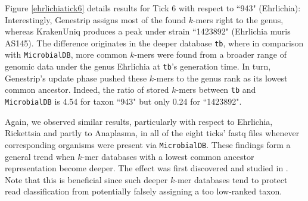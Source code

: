 \documentclass[pdflatex,sn-vancouver-num]{sn-jnl}
\begin{document}
    Figure \ref{ehrlichiatick6} details results for Tick 6 with respect to ``943" (Ehrlichia):
    Interestingly, Genestrip assigns most of the found $k$-mers right to the genus, whereas KrakenUniq produces a peak under strain ``1423892" (Ehrlichia muris AS145). The difference originates in the deeper database \texttt{tb}, where in comparison with \texttt{MicrobialDB}, more common $k$-mers were found from a broader range of genomic data under the genus Ehrlichia at \texttt{tb}'s generation time. In turn, Genestrip's update phase pushed these $k$-mers to the genus rank as its lowest common ancestor. Indeed, the ratio of stored $k$-mers between \texttt{tb} and \texttt{MicrobialDB} is 4.54 for taxon ``943" but only 0.24 for ``1423892". 

    Again, we observed similar results, particularly with respect to Ehrlichia, Rickettsia and partly to Anaplasma, in all of the eight ticks' fastq files whenever corresponding organisms were present via \texttt{MicrobialDB}.
    These findings form a general trend when $k$-mer databases with a lowest common ancestor representation become deeper. The effect was first discovered and studied in \cite{Nasko:2018aa}. Note that this is beneficial since such deeper $k$-mer databases tend to protect read classification from potentially falsely assigning a too low-ranked taxon. 
\end{document}
